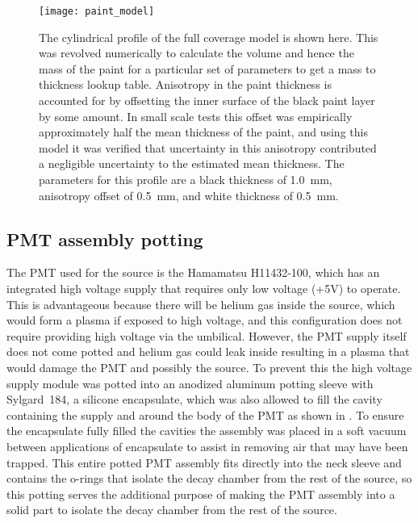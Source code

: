 \begin{figure}[h!]
\centering
\texttt{[image: paint\_model]}
\caption{The cylindrical profile of the full coverage model is shown here. This was revolved numerically to calculate the volume and hence the mass of the paint for a particular set of parameters to get a mass to thickness lookup table. Anisotropy in the paint thickness is accounted for by offsetting the inner surface of the black paint layer by some amount. In small scale tests this offset was empirically approximately half the mean thickness of the paint, and using this model it was verified that uncertainty in this anisotropy contributed a negligible uncertainty to the estimated mean thickness. The parameters for this profile are a black thickness of 1.0~mm, anisotropy offset of 0.5~mm, and white thickness of 0.5~mm. }
\label{fig:surfacemodel}
\end{figure}

\subsection{PMT assembly potting}
The PMT used for the source is the Hamamatsu H11432-100, which has an integrated high voltage supply that requires only low voltage (+5V) to operate. This is advantageous because there will be helium gas inside the source, which would form a plasma if exposed to high voltage, and this configuration does not require providing high voltage via the umbilical. However, the PMT supply itself does not come potted and helium gas could leak inside resulting in a plasma that would damage the PMT and possibly the source. To prevent this the high voltage supply module was potted into an anodized aluminum potting sleeve with Sylgard~184, a silicone encapsulate, which was also allowed to fill the cavity containing the supply and around the body of the PMT as shown in . To ensure the encapsulate fully filled the cavities the assembly was placed in a soft vacuum between applications of encapsulate to assist in removing air that may have been trapped. This entire potted PMT assembly fits directly into the neck sleeve and contains the o-rings that isolate the decay chamber from the rest of the source, so this potting serves the additional purpose of making the PMT assembly into a solid part to isolate the decay chamber from the rest of the source. 

